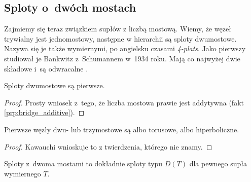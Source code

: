 
\subsection{Sploty o~dwóch mostach}
\label{sub:twobridge}%
%
%
Zajmiemy się teraz związkiem supłów z liczbą mostową.
Wiemy, że węzeł trywialny jest jednomostowy, następne w hierarchii są sploty dwumostowe.
Nazywa się je także wymiernymi, po angielsku czasami \emph{4-plats}.
Jako pierwszy studiował je Bankwitz z~Schumannem w~1934 roku.
Mają co najwyżej dwie składowe i~są odwracalne \cite[s. 211]{burde14}.

\begin{proposition}
    Sploty dwumostowe są pierwsze.
\end{proposition}

\begin{proof}
    Prosty wniosek z~tego, że liczba mostowa prawie jest addytywna (fakt \ref{prp:bridge_additive}).
\end{proof}

\begin{corollary}
    Pierwsze węzły dwu- lub trzymostowe są albo torusowe, albo hiperboliczne.
\end{corollary}

\begin{proof}
    Kawauchi \cite[s. 130]{kawauchi96} wnioskuje to z twierdzenia, którego nie znamy.
\end{proof}


\begin{proposition}
    Sploty z~dwoma mostami to dokładnie sploty typu $D(T)$ dla pewnego supła wymiernego $T$.
\end{proposition}

